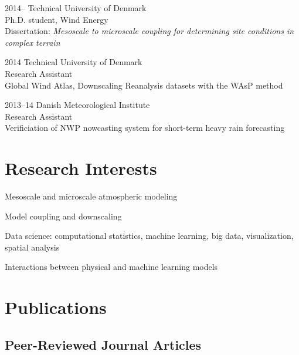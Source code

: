 \documentclass[12pt,letterpaper]{report}
\newcommand{\listitemspace}{0.15em}
\renewenvironment{itemize}
{\begin{list}{}{\setlength{\leftmargin}{0em}
				\setlength{\parskip}{0em}
				\setlength{\itemsep}{\listitemspace}
				\setlength{\parsep}{\listitemspace}}}
{\end{list}}
\begin{document}
\begin{tablist}

\item[2014--]   \tab Technical University of Denmark \\
				Ph.D. student, Wind Energy \\
				Dissertation: \textit{Mesoscale to microscale coupling for determining site conditions in complex terrain}


\item[2014] \tab Technical University of Denmark \\
				Research Assistant \\
				Global Wind Atlas, Downscaling Reanalysis datasets with the WAsP method

\item[2013--14] \tab Danish Meteorological Institute \\
				Research Assistant \\
				Verificiation of NWP nowcasting system for short-term heavy rain forecasting

\end{tablist}



\section*{Research Interests}

\begin{itemize}

\item Mesoscale and microscale atmospheric modeling

\item Model coupling and downscaling

\item Data science: computational statistics, machine learning, big data, visualization, spatial analysis

\item Interactions between physical and machine learning models

\end{itemize}


\clearpage
\section*{Publications}

\subsection*{Peer-Reviewed Journal Articles}
\end{document}
